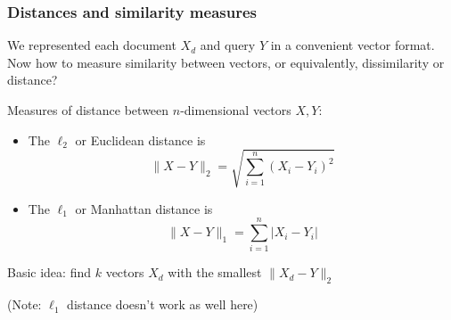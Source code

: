 \documentclass[mathserif]{beamer}
\def\red{\color[rgb]{0.8,0,0}}
\begin{document}
\begin{frame}
\frametitle{Distances and similarity measures}
\smallskip
We represented each document $X_d$ and query $Y$ in 
a convenient vector format. Now how to measure 
{\red similarity} between vectors, or equivalently,
dissimilarity or {\red distance}?

\bigskip
Measures of distance between
$n$-dimensional vectors $X,Y$:
\begin{itemize}
\item The {\red $\ell_2$} or {\red Euclidean} distance
is 
\vspace{-5pt}
$$\|X-Y\|_2 = \sqrt{\sum_{i=1}^n (X_i-Y_i)^2}$$
\item The {\red $\ell_1$} or {\red Manhattan} distance
is 
\vspace{-5pt}
$$\|X-Y\|_1 = \sum_{i=1}^n |X_i-Y_i|$$
\end{itemize}

{\red Basic idea}: find $k$ vectors $X_d$ with the 
smallest $\|X_d - Y\|_2$

(Note: $\ell_1$ distance doesn't work as well here)
\end{frame}
\end{document}
